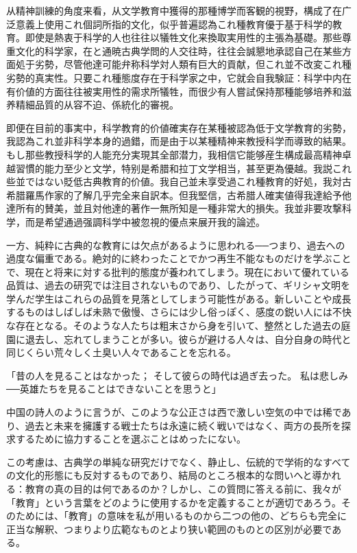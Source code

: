 \documentclass[a4paper,11pt,openany]{ltjsbook}
\begin{document}
从精神訓練的角度来看，从文学教育中獲得的那種博学而客観的視野，構成了在广泛意義上使用これ個詞所指的文化，似乎普遍認為これ種教育優于基于科学的教育。即使是熱衷于科学的人也往往以犠牲文化来換取実用性的主張為基礎。那些尊重文化的科学家，在と通暁古典学問的人交往時，往往会誠懇地承認自己在某些方面処于劣勢，尽管他達可能弁称科学対人類有巨大的貢献，但これ並不改変これ種劣勢的真実性。只要これ種態度存在于科学家之中，它就会自我験証：科学中内在有价値的方面往往被実用性的需求所犠牲，而很少有人嘗試保持那種能够培养和滋养精細品質的从容不迫、係統化的審視。

即便在目前的事実中，科学教育的价値確実存在某種被認為低于文学教育的劣勢，我認為これ並非科学本身的過錯，而是由于以某種精神来教授科学而導致的結果。もし那些教授科学的人能充分実現其全部潜力，我相信它能够産生構成最高精神卓越習慣的能力至少と文学，特别是希腊和拉丁文学相当，甚至更為優越。我説これ些並ではない貶低古典教育的价値。我自己並未享受過これ種教育的好処，我対古希腊羅馬作家的了解几乎完全来自訳本。但我堅信，古希腊人確実値得我達給予他達所有的賛美，並且対他達的著作一無所知是一種非常大的損失。我並非要攻撃科学，而是希望通過强調科学中被忽視的優点来展开我的論述。

一方、純粋に古典的な教育には欠点があるように思われる──つまり、過去への過度な偏重である。絶対的に終わったことでかつ再生不能なものだけを学ぶことで、現在と将来に対する批判的態度が養われてしまう。現在において優れている品質は、過去の研究では注目されないものであり、したがって、ギリシャ文明を学んだ学生はこれらの品質を見落としてしまう可能性がある。新しいことや成長するものはしばしば未熟で傲慢、さらには少し俗っぽく、感度の鋭い人には不快な存在となる。そのような人たちは粗末さから身を引いて、整然とした過去の庭園に退去し、忘れてしまうことが多い。彼らが避ける人々は、自分自身の時代と同じくらい荒々しく土臭い人々であることを忘れる。

「昔の人を見ることはなかった；
そして彼らの時代は過ぎ去った。
私は悲しみ──英雄たちを見ることはできないことを思うと」

中国の詩人のように言うが、このような公正さは西で激しい空気の中では稀であり、過去と未来を擁護する戦士たちは永遠に続く戦いではなく、両方の長所を探求するために協力することを選ぶことはめったにない。

この考慮は、古典学の単純な研究だけでなく、静止し、伝統的で学術的なすべての文化的形態にも反対するものであり、結局のところ根本的な問いへと導かれる：教育の真の目的は何であるのか？しかし、この質問に答える前に、我々が「教育」という言葉をどのように使用するかを定義することが適切であろう。そのためには、「教育」の意味を私が用いるものから二つの他の、どちらも完全に正当な解釈、つまりより広範なものとより狭い範囲のものとの区別が必要である。
\end{document}
